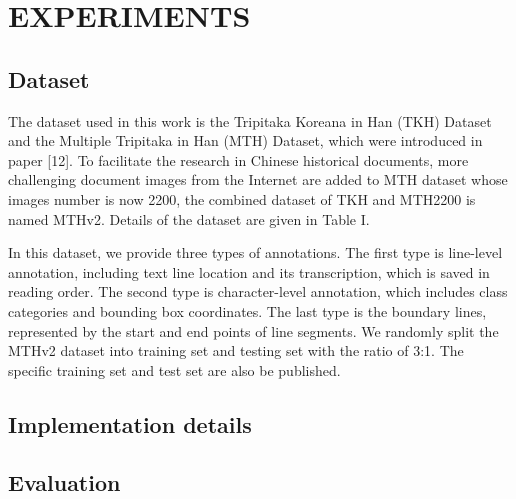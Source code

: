 
\section{EXPERIMENTS}


\subsection{Dataset}
The dataset\cite{Alpher03} used in this work is the Tripitaka Koreana in Han (TKH) Dataset and the Multiple Tripitaka in Han (MTH) Dataset, which were introduced in paper [12]. To facilitate the research in Chinese historical documents, more challenging document images from the Internet are added to MTH dataset whose images number is now 2200, the combined dataset of TKH and MTH2200 is named MTHv2. Details of the dataset are given in Table I. 

In this dataset, we provide three types of annotations. The first type is line-level annotation, including text line location and its transcription, which is saved in reading order. The second type is character-level annotation, which includes class categories and bounding box coordinates. The last type is the boundary lines, represented by the start and end points of line segments. We randomly split the MTHv2 dataset into training set and testing set with the ratio of 3:1. The specific training set and test set are also be published.

\subsection{Implementation details}


\subsection{Evaluation}

